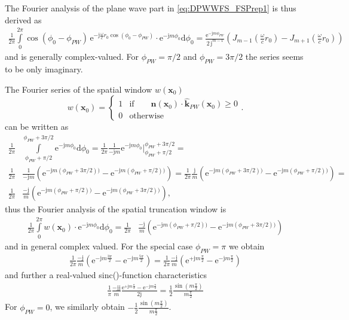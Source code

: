 \documentclass[a4paper,BCOR=15mm,10pt,twoside]{scrartcl}
\newcommand\e{\mathrm{e}}  %
\newcommand\im{\mathrm{j}}  %
\newcommand\fsd{\mathrm{d}}  %
\renewcommand{\vec}[1]{\mathbf{#1}}  %
\newcommand\unitn{\vec{n}}  %
\begin{document}
The Fourier analysis of the plane wave part in \eqref{eq:DPWWFS_FSPrep1} is thus derived as
\begin{align}
\frac{1}{2 \pi}
\int\limits_0^{2 \pi}
\cos(\phi_0-\phi_{PW})
\, \mathrm{e}^{- \mathrm{j} \frac{\omega}{c} r_0
\cos(\phi_0-\phi_{PW})} \cdot \e^{- \im m \phi_0 } \fsd \phi_0 
= \frac{\e^{- \im m \phi_{PW}}}{2\,\im^{m-1}}
(J_{m-1}(\frac{\omega}{c} r_0) - J_{m+1}(\frac{\omega}{c} r_0))
\end{align}
and is generally complex-valued. For $\phi_{PW}=\pi/2$ and $\phi_{PW}=3\pi/2$  the series seems to be only imaginary.

The Fourier series of the spatial window $w(\vec{x}_0)$
\begin{equation}
w(\vec{x}_0) =
    \begin{cases}
      1 & \text{if}\qquad
       \unitn(\vec{x}_0) \cdot \hat{\vec{k}}_{PW}(\vec{x}_0) \geq 0 \\
      0 & \text{otherwise}
    \end{cases}.
\end{equation}
can be written as
\begin{align}
\frac{1}{2 \pi}& \int\limits_{\phi_{PW}+\pi/2}^{\phi_{PW}+3\pi/2} \e^{- \im m \phi_0 } \fsd \phi_0 =
\frac{1}{2 \pi} \frac{1}{-\im m} \e^{- \im m \phi_0 }\bigg|_{\phi_{PW}+\pi/2}^{\phi_{PW}+3\pi/2} =\\
\frac{1}{2 \pi}& \frac{1}{-\im m} (\e^{- \im m (\phi_{PW}+3\pi/2)) } - \e^{- \im m (\phi_{PW}+\pi/2))})=
\frac{1}{2 \pi} \frac{\im}{m} (\e^{- \im m (\phi_{PW}+3\pi/2)) } - \e^{- \im m (\phi_{PW}+\pi/2))})=\\
\frac{1}{2 \pi}& \frac{-\im}{m} (\e^{- \im m (\phi_{PW}+\pi/2))}-\e^{- \im m (\phi_{PW}+3\pi/2)) }),
\end{align}
thus the Fourier analysis of the spatial truncation window is
\begin{align}
\frac{1}{2 \pi}
\int\limits_0^{2 \pi} w(\vec{x}_0) \cdot \e^{- \im m \phi_0 } \fsd \phi_0 = \frac{1}{2 \pi}& \frac{-\im}{m} (\e^{- \im m (\phi_{PW}+\pi/2))}-\e^{- \im m (\phi_{PW}+3\pi/2)) })
\end{align}
and in general complex valued. For the special case $\phi_{PW} = \pi$ we obtain
\begin{align}
\frac{1}{2 \pi} \frac{-\im}{m} (\e^{- \im m \frac{3 \pi}{2}}-\e^{- \im m \frac{5 \pi}{2} }) =
\frac{1}{2 \pi} \frac{-\im}{m} (\e^{+ \im m \frac{\pi}{2}}-\e^{- \im m \frac{\pi}{2} })
\end{align}
and further a real-valued sinc()-function characteristics
\begin{align}
\frac{1}{\pi} \frac{-\im\im}{m} \frac{\e^{+ \im m \frac{\pi}{2}}-\e^{- \im m \frac{\pi}{2} }}{2 \im} = \frac{1}{2} \frac{\sin(m\frac{\pi}{2})}{m\frac{\pi}{2}}
\end{align}
For $\phi_{PW} = 0$, we similarly obtain $-\frac{1}{2} \frac{\sin(m\frac{\pi}{2})}{m\frac{\pi}{2}}$.
\end{document}
